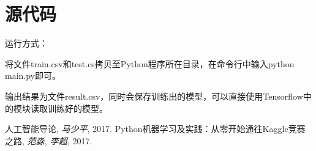 \documentclass{article}
\begin{document}
\section{源代码}
  运行方式：

  将文件train.csv和test.cs拷贝至Python程序所在目录，在命令行中输入python main.py即可。

  输出结果为文件result.csv，同时会保存训练出的模型，可以直接使用Tensorflow中的模块读取训练好的模型。



\begin{thebibliography}{9}
  人工智能导论,
  \emph{马少平},
  2017.
  Python机器学习及实践：从零开始通往Kaggle竞赛之路,
  \emph{范淼, 李超},
  2017.
\end{thebibliography}
\end{document}
